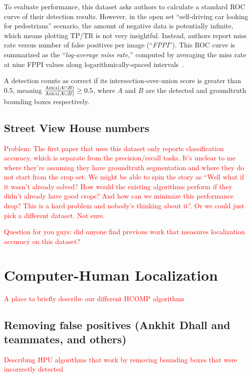 \documentclass[10pt,twocolumn,letterpaper]{article}
\newcommand{\preliminary}[1]{\textcolor{red}{#1}}
\newcommand{\todo}{\colorbox{yellow}{\fbox{\LARGE{TODO}}}}
\begin{document}
To evaluate performance, this dataset asks authors to calculate a standard ROC curve of their detection results. However, in the open set ``self-driving car looking for pedestrians'' scenario, the amount of negative data is potentially infinite, which means plotting TP/TR is not very insightful. Instead, authors report miss rate versus number of false positives per image (``\emph{FPPI}''). This ROC curve is summarized as the ``\emph{log-average miss rate,}'' computed by averaging the miss rate at nine FPPI values along logarithmically-spaced intervals~\cite{Dollar2012PAMI}.

A detection counts as correct if its intersection-over-union score is greater than 0.5, meaning $\frac{\textsc{Area}(A \cap B)}{\textsc{Area}(A \cup B)} \geq 0.5$, where $A$ and $B$ are the detected and groundtruth bounding boxes respectively.

\subsection{Street View House numbers}
\cite{netzer2011reading}

\preliminary{Problem: The first paper that uses this dataset \cite{netzer2011reading} only reports classification accuracy, which is separate from the precision/recall tasks. It's unclear to me where they're assuming they have groundtruth segmentation and where they do not start from the crop set. We might be able to spin the story as ``Well what if it wasn't already solved? How would the existing algorithms perform if they didn't already have good crops? And how can we minimize this performance drop? This is a hard problem and nobody's thinking about it''. Or we could just pick a different dataset. Not sure.}

\preliminary{Question for you guys: did anyone find previous work that measures localization accuracy on this dataset?}

\section{Computer-Human Localization}
\preliminary{
A place to briefly describe our different HCOMP algorithms
}

\subsection{Removing false positives (Ankhit Dhall and teammates, and others)}
\todo \preliminary{ Describing HPU algorithms that work by removing bounding boxes that were incorrectly detected }
\end{document}
